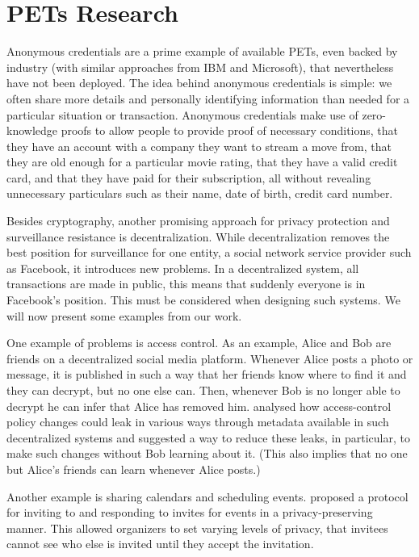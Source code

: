\section{\acp{PET} Research}

Anonymous credentials are a prime example of available \acp{PET},
even backed by industry (with similar approaches from IBM and
Microsoft), that nevertheless have not been deployed. The idea behind
anonymous credentials is simple: we often share more details and
personally identifying information than needed for a particular
situation or transaction. Anonymous credentials make use of
zero-knowledge proofs to allow people to provide proof of necessary
conditions, \eg that they have an account with a company they want to
stream a move from, that they are old enough for a particular movie
rating, that they have a valid credit card, and that they have paid
for their subscription, all without revealing unnecessary particulars
such as their name, date of birth, credit card number. 

Besides cryptography, another promising approach for privacy
protection and surveillance resistance is decentralization. 
While decentralization removes the best position for surveillance for one entity, \eg 
a social network service provider such as Facebook, it introduces new problems.
In a decentralized system, all transactions are made in public, this means that 
suddenly everyone is in Facebook's position.
This must be considered when designing such systems.
We will now present some examples from our work.

One example of problems is access control.
As an example, Alice and Bob are friends on a decentralized social media 
platform.
Whenever Alice posts a photo or message, it is published in such a way that her 
friends know where to find it and they can decrypt, but no one else can.
Then, whenever Bob is no longer able to decrypt he can infer that Alice has 
removed him.
\Textcite{PPACinPubFS} analysed how access-control policy changes could leak in 
various ways through metadata available in such decentralized systems and 
suggested a way to reduce these leaks, in particular, to make such changes 
without Bob learning about it.
(This also implies that no one but Alice's friends can learn whenever Alice 
posts.)

Another example is sharing calendars and scheduling events.
\Textcite{EventsInvitations} proposed a protocol for inviting to and responding 
to invites for events in a privacy-preserving manner.
This allowed organizers to set varying levels of privacy, \eg that invitees 
cannot see who else is invited until they accept the invitation.

